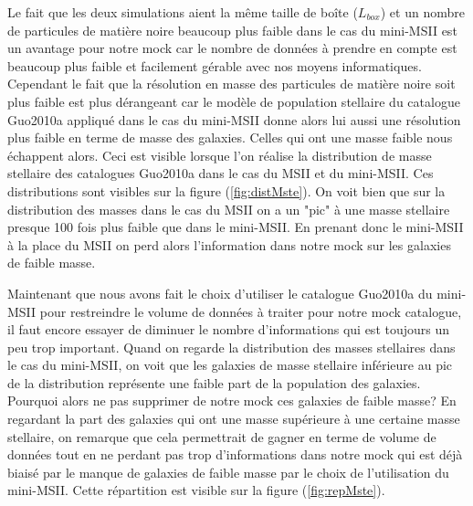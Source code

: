 Le fait que les deux simulations aient la même taille de boîte ($L_{box}$) et un nombre de particules de matière noire beaucoup
plus faible dans le cas du mini-MSII est un avantage pour notre mock car le nombre de données à prendre en compte est beaucoup plus
faible et facilement gérable avec nos moyens informatiques. Cependant le fait que la résolution en masse des particules de matière
noire soit plus faible est plus dérangeant car le modèle de population stellaire du catalogue Guo2010a appliqué dans le cas du
mini-MSII donne alors lui aussi une résolution plus faible en terme de masse des galaxies. Celles qui ont une masse faible nous
échappent alors. Ceci est visible lorsque l'on réalise la distribution de masse stellaire des catalogues Guo2010a dans le cas du
MSII et du mini-MSII. Ces distributions sont visibles sur la figure (\ref{fig:distMste}). On voit bien que sur la distribution des
masses dans le cas du MSII on a un "pic" à une masse stellaire presque 100 fois plus faible que dans le mini-MSII. En prenant donc
le mini-MSII à la place du MSII on perd alors l'information dans notre mock sur les galaxies de faible masse.

Maintenant que nous avons fait le choix d'utiliser le catalogue Guo2010a du mini-MSII pour restreindre le volume de données à
traiter pour notre mock catalogue, il faut encore essayer de diminuer le nombre d'informations qui est toujours un peu trop
important. Quand on regarde la distribution des masses stellaires dans le cas du mini-MSII, on voit que les galaxies de masse
stellaire inférieure au pic de la distribution représente une faible part de la population des galaxies. Pourquoi alors ne pas
supprimer de notre mock ces galaxies de faible masse? En regardant la part des galaxies qui ont une masse supérieure à une certaine
masse stellaire, on remarque que cela permettrait de gagner en terme de volume de données tout en ne perdant pas trop
d'informations dans notre mock qui est déjà biaisé par le manque de galaxies de faible masse par le choix de l'utilisation du
mini-MSII. Cette répartition est visible sur la figure (\ref{fig:repMste}).

